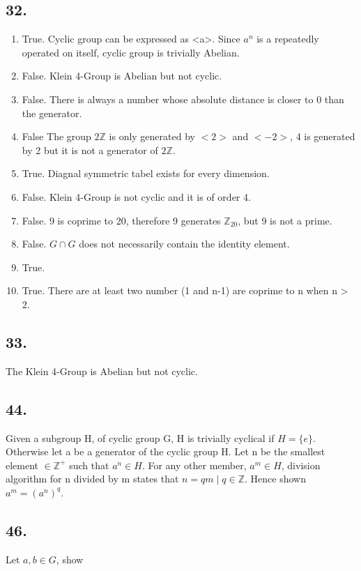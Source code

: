 \documentclass{article}
\begin{document}
\subsection*{32. }
	\begin{enumerate}[label=\textbf{\alph*}.]
		\item True. Cyclic group can be expressed as <a>. Since $a^n$ is a
			repeatedly operated on itself, cyclic group is trivially
			Abelian.
		\item False. Klein 4-Group is Abelian but not cyclic.
		\item False. There is always a number whose absolute distance is closer to 0
			than the generator.
		\item False The group $2\mathbb{Z}$ is only generated by $<2>$ and $<-2>$, 4
			is generated by 2 but it is not a generator of $2\mathbb{Z}$.
		\item True. Diagnal symmetric tabel exists for every dimension.
		\item False. Klein 4-Group is not cyclic and it is of order 4.
		\item False. 9 is coprime to 20, therefore 9 generates $\mathbb{Z}_{20}$,
			but 9 is not a prime.
		\item False. $G \cap G$ does not necessarily contain the identity element.
		\item True.
		\item True. There are at least two number (1 and n-1) are coprime to n when
			n > 2.
	\end{enumerate}

\subsection*{33. }
The Klein 4-Group is Abelian but not cyclic.

\subsection*{44. }
Given a subgroup H, of cyclic group G, H is trivially cyclical if $H = \{e\}$.
Otherwise let a be a generator of the cyclic group H. Let n be the smallest
element $\in \mathbb{Z}^+$ such that $a^n \in H$. For any other member, $a^m \in
H$, division algorithm for n divided by m states that $n=qm \mid
q\in\mathbb{Z}$. Hence shown $a^m = (a^n)^q$.

\subsection*{46. }
	Let $a, b \in G$, show 
\end{document}
